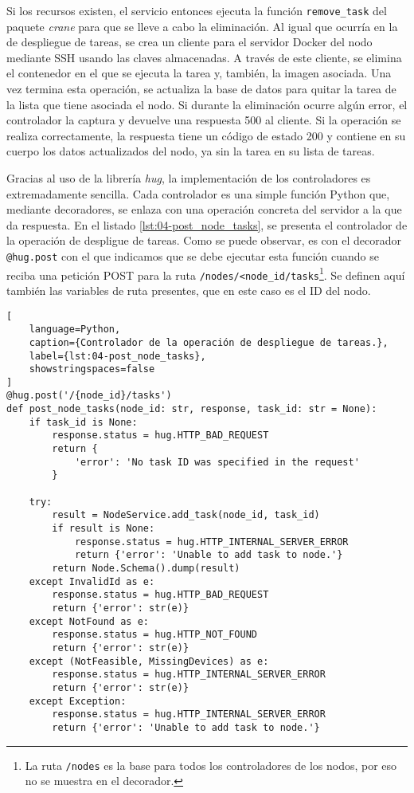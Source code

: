 \begin{itemize}
          Si los recursos existen, el servicio entonces ejecuta la función
          \texttt{remove\_task} del paquete \textit{crane} para que se lleve a
          cabo la eliminación. Al igual que ocurría en la de despliegue de
          tareas, se crea un cliente para el servidor Docker del nodo mediante
          SSH usando las claves almacenadas. A través de este cliente, se
          elimina el contenedor en el que se ejecuta la tarea y, también, la
          imagen asociada. Una vez termina esta operación, se actualiza la base
          de datos para quitar la tarea de la lista que tiene asociada el nodo.
          Si durante la eliminación ocurre algún error, el controlador la
          captura y devuelve una respuesta 500 al cliente. Si la operación se
          realiza correctamente, la respuesta tiene un código de estado 200 y
          contiene en su cuerpo los datos actualizados del nodo, ya sin la tarea
          en su lista de tareas.
\end{itemize}

Gracias al uso de la librería \textit{hug}, la implementación de los
controladores es extremadamente sencilla. Cada controlador es una simple función
Python que, mediante decoradores, se enlaza con una operación concreta del
servidor a la que da respuesta. En el listado \ref{lst:04-post_node_tasks}, se
presenta el controlador de la operación de despligue de tareas. Como se puede
observar, es con el decorador \lstinline{@hug.post} con el que indicamos que se
debe ejecutar esta función cuando se reciba una petición POST para la ruta
\texttt{/nodes/<node\_id/tasks}\footnote{La ruta \texttt{/nodes} es la base para
    todos los controladores de los nodos, por eso no se muestra en el decorador.}.
Se definen aquí también las variables de ruta presentes, que en este caso es el
ID del nodo.

\begin{lstlisting}[
    language=Python,
    caption={Controlador de la operación de despliegue de tareas.},
    label={lst:04-post_node_tasks},
    showstringspaces=false
]
@hug.post('/{node_id}/tasks')
def post_node_tasks(node_id: str, response, task_id: str = None):
    if task_id is None:
        response.status = hug.HTTP_BAD_REQUEST
        return {
            'error': 'No task ID was specified in the request'
        }

    try:
        result = NodeService.add_task(node_id, task_id)
        if result is None:
            response.status = hug.HTTP_INTERNAL_SERVER_ERROR
            return {'error': 'Unable to add task to node.'}
        return Node.Schema().dump(result)
    except InvalidId as e:
        response.status = hug.HTTP_BAD_REQUEST
        return {'error': str(e)}
    except NotFound as e:
        response.status = hug.HTTP_NOT_FOUND
        return {'error': str(e)}
    except (NotFeasible, MissingDevices) as e:
        response.status = hug.HTTP_INTERNAL_SERVER_ERROR
        return {'error': str(e)}
    except Exception:
        response.status = hug.HTTP_INTERNAL_SERVER_ERROR
        return {'error': 'Unable to add task to node.'}   
\end{lstlisting}

